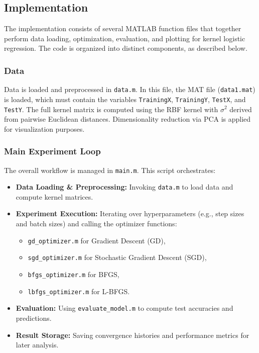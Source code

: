 \documentclass{article}
\begin{document}
\subsection{Implementation}
The implementation consists of several MATLAB function files that together perform data loading, optimization, evaluation, and plotting for kernel logistic regression. The code is organized into distinct components, as described below.
\subsubsection{Data}
Data is loaded and preprocessed in \texttt{data.m}. In this file, the MAT file (\texttt{data1.mat}) is loaded, which must contain the variables \texttt{TrainingX}, \texttt{TrainingY}, \texttt{TestX}, and \texttt{TestY}. The full kernel matrix is computed using the RBF kernel with \(\sigma^2\) derived from pairwise Euclidean distances. Dimensionality reduction via PCA is applied for visualization purposes.
\subsubsection{Main Experiment Loop}
The overall workflow is managed in \texttt{main.m}. This script orchestrates:
\begin{itemize}
    \item \textbf{Data Loading \& Preprocessing:} Invoking \texttt{data.m} to load data and compute kernel matrices.
    \item \textbf{Experiment Execution:} Iterating over hyperparameters (e.g., step sizes and batch sizes) and calling the optimizer functions:
          \begin{itemize}
              \item \texttt{gd\_optimizer.m} for Gradient Descent (GD),
              \item \texttt{sgd\_optimizer.m} for Stochastic Gradient Descent (SGD),
              \item \texttt{bfgs\_optimizer.m} for BFGS,
              \item \texttt{lbfgs\_optimizer.m} for L-BFGS.
          \end{itemize}
    \item \textbf{Evaluation:} Using \texttt{evaluate\_model.m} to compute test accuracies and predictions.
    \item \textbf{Result Storage:} Saving convergence histories and performance metrics for later analysis.
\end{itemize}
\end{document}
